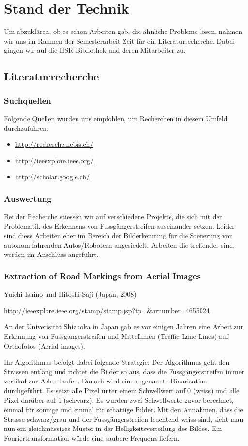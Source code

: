 \section{Stand der Technik}
Um abzuklären, ob es schon Arbeiten gab, die ähnliche Probleme lösen, nahmen wir uns im Rahmen der Semesterarbeit Zeit für ein Literaturrecherche. Dabei gingen wir auf die HSR Bibliothek und deren Mitarbeiter zu.
\subsection{Literaturrecherche}
\subsubsection{Suchquellen}
Folgende Quellen wurden uns empfohlen, um Recherchen in diesem Umfeld durchzuführen:
\begin{itemize}
	\item \url{http://recherche.nebis.ch/}
    \item \url{http://ieeexplore.ieee.org/}
    \item \url{http://scholar.google.ch/}
\end{itemize}

\subsubsection{Auswertung}
Bei der Recherche stiessen wir auf verschiedene Projekte, die sich mit der Problematik des Erkennens von Fussgängerstreifen auseinander setzen. Leider sind diese Arbeiten eher im Bereich der Bilderkennung für die Steuerung von autonom fahrenden Autos/Robotern angesiedelt. Arbeiten die treffender sind, werden im Anschluss angeführt.
\subsubsection{Extraction of Road Markings from Aerial Images}
Yuichi Ishino und Hitoshi Saji (Japan, 2008) \newline 

\onehalfspacing 
\url{http://ieeexplore.ieee.org/stamp/stamp.jsp?tp=\&arnumber=4655024}
\onehalfspacing

An der Univerisität Shizuoka in Japan gab es vor einigen Jahren eine Arbeit zur Erkennung von Fussgängerstreifen und Mittellinien (Traffic Lane Lines) auf Orthofotos (Aerial images).

Ihr Algorithmus befolgt dabei folgende Strategie:
Der Algorithmus geht den Strassen entlang und richtet die Bilder so aus, dass die Fussgängerstreifen immer vertikal zur Achse laufen. Danach wird eine sogenannte Binarization durchgeführt. Es setzt alle Pixel unter einem Schwellwert auf 0 (weiss) und alle Pixel darüber auf 1 (schwarz). Es wurden zwei Schwellwerte zuvor berechnet, einmal für sonnige und einmal für schattige Bilder.
Mit den Annahmen, dass die Strasse schwarz/grau und der Fussgängerstreifen leuchtend weiss sind, sieht man nun ein gleichmässiges Muster in der Helligkeitsverteilung des Bildes. Ein Fouriertransformation würde eine saubere Frequenz liefern.

